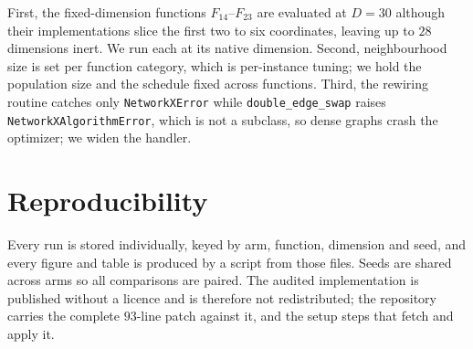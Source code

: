 \documentclass[lettersize,journal]{IEEEtran}
\begin{document}
First, the fixed-dimension functions $F_{14}$--$F_{23}$ are evaluated at
$D=30$ although their implementations slice the first two to six coordinates,
leaving up to $28$ dimensions inert. We run each at its native dimension.
Second, neighbourhood size is set per function category, which is per-instance
tuning; we hold the population size and the schedule fixed across functions.
Third, the rewiring routine catches only \texttt{NetworkXError} while
\texttt{double\_edge\_swap} raises \texttt{NetworkXAlgorithmError}, which is
not a subclass, so dense graphs crash the optimizer; we widen the handler.

\section{Reproducibility}
\label{sec:supp:repro}

Every run is stored individually, keyed by arm, function, dimension and seed,
and every figure and table is produced by a script from those files. Seeds are
shared across arms so all comparisons are paired. The audited implementation is
published without a licence and is therefore not redistributed; the repository
carries the complete $93$-line patch against it, and the setup steps that fetch
and apply it.
\end{document}
